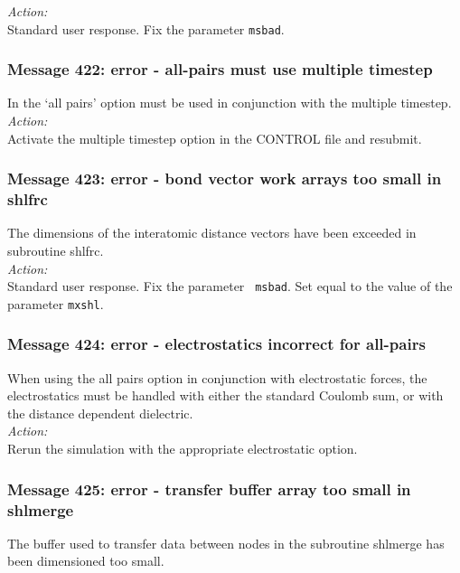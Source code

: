 \noindent
{\em Action:} \\
Standard user response. Fix the parameter {\tt msbad}.


\subsubsection*{Message 422: error - all-pairs must use multiple
timestep}

In \D{} the `all pairs' option must be used in conjunction
with the multiple timestep. \\

\noindent
{\em Action:} \\
Activate the multiple timestep option in the CONTROL file and resubmit.

\subsubsection*{Message 423: error - bond vector work arrays too small
in shlfrc}

The dimensions of the interatomic distance vectors have been exceeded
in subroutine {\sc shlfrc}. \\

\noindent
{\em Action:} \\ Standard user response. Fix the parameter {\tt
msbad}. Set equal to the value of the parameter {\tt mxshl}.

\subsubsection*{Message 424: error - electrostatics incorrect for
all-pairs}

When using the all pairs option in conjunction with electrostatic
forces, the electrostatics  must be handled with either the standard Coulomb sum, or with the distance dependent dielectric. \\

\noindent
{\em Action:} \\
Rerun the simulation with the appropriate electrostatic option.

\subsubsection*{Message 425: error - transfer buffer array too small in
shlmerge}

The buffer used to transfer data between nodes in the subroutine {\sc
shlmerge} has been dimensioned too small.\\

